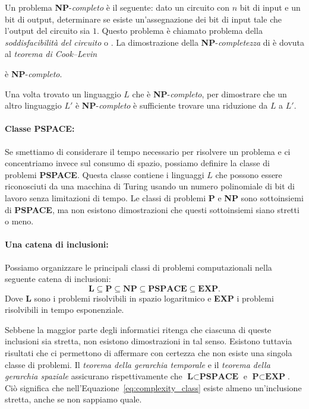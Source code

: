 Un problema \textbf{NP}-\emph{completo} è il seguente: dato un circuito con $n$ bit di input e un bit di output, determinare se esiste un'assegnazione dei bit di input tale che l'output del circuito sia $1$. Questo problema è chiamato problema della \emph{soddisfacibilità del circuito} o . La dimostrazione della \textbf{NP}-\emph{completezza} di  è dovuta al \emph{teorema di Cook–Levin}
\begin{theorem}
	 è \textbf{NP}-\emph{completo}.
\end{theorem}
Una volta trovato un linguaggio $L$ che è \textbf{NP}-\emph{completo}, per dimostrare che un altro linguaggio $L'$ è \textbf{NP}-\emph{completo} è sufficiente trovare una riduzione da $L$ a $L'$.

\paragraph{Classe PSPACE:} Se smettiamo di considerare il tempo necessario per risolvere un problema e ci concentriamo invece sul consumo di spazio, possiamo definire la classe di problemi \textbf{PSPACE}. Questa classe contiene i linguaggi $L$ che possono essere riconosciuti da una macchina di Turing usando un numero polinomiale di bit di lavoro senza limitazioni di tempo. Le classi di problemi \textbf{P} e \textbf{NP} sono sottoinsiemi di \textbf{PSPACE}, ma non esistono dimostrazioni che questi sottoinsiemi siano stretti o meno.

\paragraph{Una catena di inclusioni:}
Possiamo organizzare le principali classi di problemi computazionali nella seguente catena di inclusioni:
\begin{equation}
	\textbf{L} \subseteq \textbf{P} \subseteq \textbf{NP} \subseteq \textbf{PSPACE} \subseteq \textbf{EXP}.
	\label{eq:complexity_class}
\end{equation}
Dove \textbf{L} sono i problemi risolvibili in spazio logaritmico e \textbf{EXP} i problemi risolvibili in tempo esponenziale.

Sebbene la maggior parte degli informatici ritenga che ciascuna di queste inclusioni sia stretta, non esistono dimostrazioni in tal senso. Esistono tuttavia risultati che ci permettono di affermare con certezza che non esiste una singola classe di problemi. Il \emph{teorema della gerarchia temporale} e il \emph{teorema della gerarchia spaziale} assicurano rispettivamente che $\textbf{L} \subset \textbf{PSPACE}$ e $\textbf{P} \subset \textbf{EXP}$. Ciò significa che nell'Equazione~\ref{eq:complexity_class} esiste almeno un'inclusione stretta, anche se non sappiamo quale.

